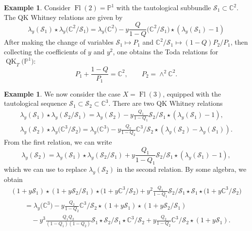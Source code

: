 \documentclass[pdftex]{sigma}
\numberwithin{equation}{section}
\theoremstyle{definition}
\newtheorem{Example}[Theorem]{Example}
\DeclareMathOperator{\Fl}{Fl}
\DeclareMathOperator{\QK}{QK}
\newcommand{\bP}{{\mathbb P}}
\newcommand{\C}{{\mathbb C}}
\newcommand{\cS}{{\mathcal S}}
\begin{document}
 \begin{Example} Consider $\Fl(2)= \bP^1$ with the tautological subbundle
 $\cS_1 \subset \C^2$. The QK Whitney relations are given by
 \[
 \lambda_y(\cS_1) \star \lambda_y\bigl(\mathbb{C}^2/\cS_1\bigr)= \lambda_y\bigl(\mathbb{C}^2\bigr)-y\frac{Q}{1-Q}\bigl(\mathbb{C}^2/\cS_1\bigr) \star (\lambda_y(\cS_1)-1)
 \]
 After making the change of variables
 $\mathcal{S}_1 \mapsto P_1$
 and $\mathbb{C}^2/\cS_1 \mapsto (1-Q)P_2/{P_1}$, then
 collecting the coefficients of $y$ and $y^2$, one obtains
 the Toda relations for $\QK_T\bigl(\mathbb{P}^1\bigr)$:
 \[
 P_1 +\frac{1-Q}{P_1} = \mathbb{C}^2, \qquad P_2 = \wedge^2\mathbb{C}^2 .
 \]
 \end{Example}
 \begin{Example} We now consider the case $X=\Fl(3)$, equipped with the
 tautological sequence $\cS_1 \subset \cS_2 \subset \C^3$.
 There are two QK Whitney relations
 \begin{gather*}%
 \lambda_y(\mathcal{S}_1) \star \lambda_y(\mathcal{S}_2/\mathcal{S}_1) = \lambda_y(\mathcal{S}_2) - y\frac{Q_1}{1-Q_1} \mathcal{S}_2/\mathcal{S}_1 \star (\lambda_y(\mathcal{S}_1)-1),
 \\%
 \lambda_y(\mathcal{S}_2) \star \lambda_y\bigl(\mathbb{C}^3/\mathcal{S}_2\bigr) = \lambda_y\bigl(\mathbb{C}^3\bigr)-y\frac{Q_2}{1-Q_2}\mathbb{C}^3/{\mathcal{S}_2} \star (\lambda_y(\mathcal{S}_2)-\lambda_y(\mathcal{S}_1)) .
 \end{gather*}
 From the first relation, we can write
 \[\lambda_y(\mathcal{S}_2) = \lambda_y(\mathcal{S}_1) \star \lambda_y(\mathcal{S}_2/\mathcal{S}_1) + y\frac{Q_1}{1-Q_1} \mathcal{S}_2/\mathcal{S}_1 \star (\lambda_y(\mathcal{S}_1)-1),
 \]
 which we can use to replace $\lambda_y(\mathcal{S}_2)$ in the second relation. By some algebra, we obtain
 \begin{gather*}
 (1+y\mathcal{S}_1)\star(1+y\mathcal{S}_2/\mathcal{S}_1)\star\bigl(1+y\mathbb{C}^3/\mathcal{S}_2\bigr)+y^2\frac{Q_1}{1-Q_1}\mathcal{S}_2/\mathcal{S}_1 \star \mathcal{S}_1 \star \bigl(1+y\mathbb{C}^3/\mathcal{S}_2\bigr)\\
 \qquad{}=\lambda_y\bigl(\C^3\bigr)-y\frac{Q_2}{1-Q_2}\mathbb{C}^3/\mathcal{S}_2 \star (1+y\mathcal{S}_1)\star(1+y\mathcal{S}_2/\mathcal{S}_1)\\
 \qquad\quad{}- y^3\frac{Q_1Q_2}{(1-Q_1)(1-Q_2)}\mathcal{S}_1 \star \mathcal{S}_2/\mathcal{S}_1 \star \mathbb{C}^3/\mathcal{S}_2 + y\frac{Q_2}{1-Q_2}\mathbb{C}^3/\mathcal{S}_2\star(1+y\mathcal{S}_1).
 \end{gather*}

\end{Example}
\end{document}
